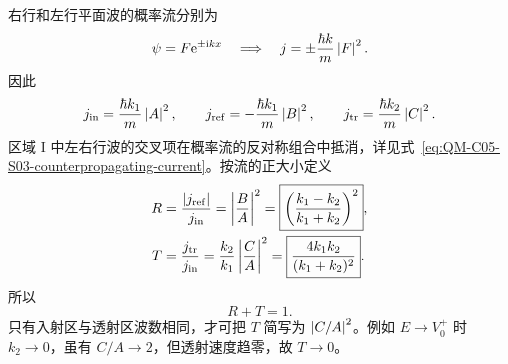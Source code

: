 右行和左行平面波的概率流分别为
\begin{equation}
  \psi=F\mathrm{e}^{\pm\mathrm{i} kx}
  \quad\Longrightarrow\quad
  j=\pm\frac{\hbar k}{m}\left|F\right|^2.
  \label{eq:QM-C05-S04-plane-wave-current}
\end{equation}
因此
\begin{equation}
  j_{\mathrm{in}}=\frac{\hbar k_1}{m}\left|A\right|^2,
  \qquad
  j_{\mathrm{ref}}=-\frac{\hbar k_1}{m}\left|B\right|^2,
  \qquad
  j_{\mathrm{tr}}=\frac{\hbar k_2}{m}\left|C\right|^2.
  \label{eq:QM-C05-S04-three-currents}
\end{equation}
区域 I 中左右行波的交叉项在概率流的反对称组合中抵消，详见式~\eqref{eq:QM-C05-S03-counterpropagating-current}。按流的正大小定义
\begin{align}
  R&=\frac{\left|j_{\mathrm{ref}}\right|}{j_{\mathrm{in}}}
   =\left|\frac BA\right|^2
   =\boxed{\left(\frac{k_1-k_2}{k_1+k_2}\right)^2},
  \label{eq:QM-C05-S04-reflection-coefficient}\\
  T&=\frac{j_{\mathrm{tr}}}{j_{\mathrm{in}}}
   =\frac{k_2}{k_1}\left|\frac CA\right|^2
   =\boxed{\frac{4k_1k_2}{(k_1+k_2)^2}}.
  \label{eq:QM-C05-S04-transmission-coefficient}
\end{align}
所以
\begin{equation}
  R+T=1.
  \label{eq:QM-C05-S04-current-conservation}
\end{equation}
只有入射区与透射区波数相同，才可把 $T$ 简写为 $\left|C/A\right|^2$。例如 $E\to V_0^+$ 时 $k_2\to0$，虽有 $C/A\to2$，但透射速度趋零，故 $T\to0$。

